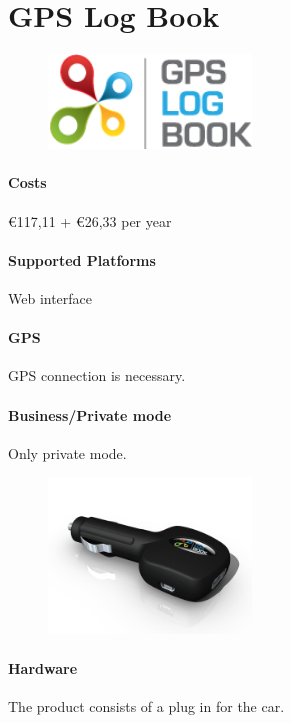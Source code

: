\section{GPS Log Book}
\begin{figure}
  \begin{center}
    \includegraphics[width=0.48\textwidth]{bilder/GPSlogbook}
  \end{center}
\end{figure}
\paragraph{Costs} \euro 117,11 + \euro 26,33 per year
\paragraph{Supported Platforms} Web interface
\paragraph{GPS} GPS connection is necessary.
\paragraph{Business/Private mode} Only private mode.
\begin{figure}
  \begin{center}
    \includegraphics[width=0.48\textwidth]{bilder/GPSlogbook2}
  \end{center}
\end{figure}
\paragraph{Hardware}The product consists of a plug in for the car.
